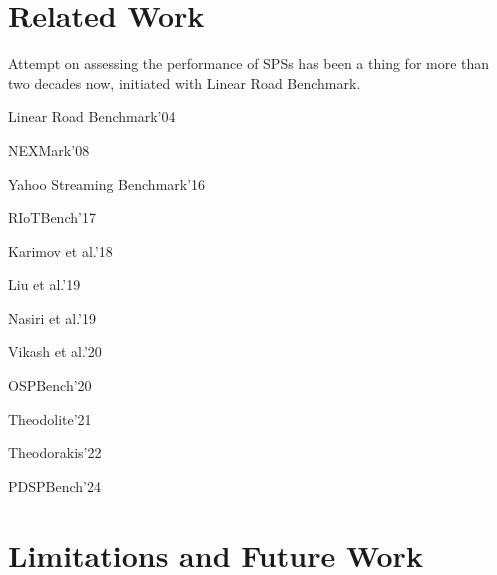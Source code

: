 \documentclass[runningheads]{llncs}
\newcommand{\legend}[2][]{
    \begin{scope}[#1]
    \path
        \foreach \n/\s in {#2}
            {
                  ++(0,-10pt) node[\s,legend box] {} +(5pt,0) node[legend label] {\n}
            }
    ;
    \end{scope}
}
\begin{document}

\section{Related Work}

Attempt on assessing the performance of SPSs has been a thing for more than two decades now, initiated with Linear Road Benchmark\cite{linearroad04}.


Linear Road Benchmark'04

NEXMark'08

Yahoo Streaming Benchmark'16

RIoTBench'17

Karimov et al.'18

Liu et al.'19

Nasiri et al.'19

Vikash et al.'20

OSPBench'20

Theodolite'21

Theodorakis'22

PDSPBench'24

\section{Limitations and Future Work}
\end{document}
